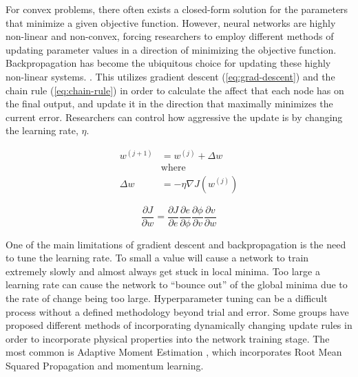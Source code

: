 For convex problems, there often exists a closed-form solution for the parameters that minimize a given objective function. However, neural networks are highly non-linear and non-convex, forcing researchers to employ different methods of updating parameter values in a direction of minimizing the objective function. Backpropagation has become the ubiquitous choice for updating these highly non-linear systems. \cite{rumelhartLearningRepresentationsBackpropagating1986}. This utilizes gradient descent (\cref{eq:grad-descent}) and the chain rule (\cref{eq:chain-rule}) in order to calculate the affect that each node has on the final output, and update it in the direction that maximally minimizes the current error. Researchers can control how aggressive the update is by changing the learning rate, $\eta$.

\begin{equation}
    \begin{aligned}
        w^{(j+1)} &= w^{(j)} + \Delta w\\
        &\text{where} \\
        \Delta w &= -\eta \nabla J(w^{(j)})
    \end{aligned}
    \label{eq:grad-descent}
\end{equation}

\begin{equation}
    \frac{\partial J}{\partial w} = \frac{\partial J}{\partial e}\frac{\partial e}{\partial \phi}\frac{\partial \phi}{\partial v} \frac{\partial v}{\partial w}
    \label{eq:chain-rule}
\end{equation}

One of the main limitations of gradient descent and backpropagation is the need to tune the learning rate. To small a value will cause a network to train extremely slowly and almost always get stuck in local minima. Too large a learning rate can cause the network to ``bounce out'' of the global minima due to the rate of change being too large. Hyperparameter tuning can be a difficult process without a defined methodology beyond trial and error. Some groups have proposed different methods of incorporating dynamically changing update rules in order to incorporate physical properties into the network training stage. The most common is Adaptive Moment Estimation \cite{kingmaAdamMethodStochastic2017}, which incorporates Root Mean Squared Propagation \cite{hinton2012neural} and momentum learning.

